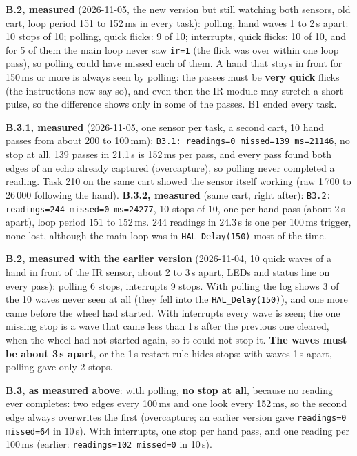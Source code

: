 \documentclass[11pt,a4paper]{article}
\begin{document}
\textbf{B.2, measured} (2026-11-05, the new version but still watching both sensors, old cart, loop period 151 to 152\,ms in every task): polling, hand waves
1 to 2\,s apart: 10 stops of 10; polling, quick flicks: 9 of 10; interrupts, quick flicks: 10 of 10, and for 5 of
them the main loop never saw \texttt{ir=1} (the flick was over within one loop pass), so polling could have missed
each of them. A hand that stays in front for 150\,ms or more is always seen by polling: the passes must be
\textbf{very quick} flicks (the instructions now say so), and even then the IR module may stretch a short pulse, so
the difference shows only in some of the passes. B1 ended every task.

\textbf{B.3.1, measured} (2026-11-05, one sensor per task, a second cart, 10 hand passes from about 200 to
100\,mm): \texttt{B3.1: readings=0 missed=139 ms=21146}, no stop at all. 139 passes in 21.1\,s is 152\,ms per
pass, and every pass found both edges of an echo already captured (overcapture), so polling never completed a
reading. Task 210 on the same cart showed the sensor itself working (raw 1\,700 to 26\,000 following the hand).
\textbf{B.3.2, measured} (same cart, right after): \texttt{B3.2: readings=244 missed=0 ms=24277}, 10 stops
of 10, one per hand pass (about 2\,s apart), loop period 151 to 152\,ms. 244 readings in 24.3\,s is one per
100\,ms trigger, none lost, although the main loop was in \texttt{HAL\_Delay(150)} most of the time.

\textbf{B.2, measured with the earlier version} (2026-11-04, 10 quick waves of a hand in front of the IR sensor, about
2 to 3\,s apart, LEDs and status line on every pass): polling 6 stops, interrupts 9 stops. With polling the log
shows 3 of the 10 waves never seen at all (they fell into the \texttt{HAL\_Delay(150)}), and one more came before the
wheel had started. With interrupts every wave is seen; the one missing stop is a wave that came less than 1\,s after
the previous one cleared, when the wheel had not started again, so it could not stop it. \textbf{The waves must be
about 3\,s apart}, or the 1\,s restart rule hides stops: with waves 1\,s apart, polling gave only 2 stops.

\textbf{B.3, as measured above}: with polling, \textbf{no stop at all}, because no reading ever completes: two
edges every 100\,ms and one look every 152\,ms, so the second edge always overwrites the first (overcapture; an
earlier version gave \texttt{readings=0 missed=64} in 10\,s). With interrupts, one stop per hand pass, and one
reading per 100\,ms (earlier: \texttt{readings=102 missed=0} in 10\,s).
\end{document}
